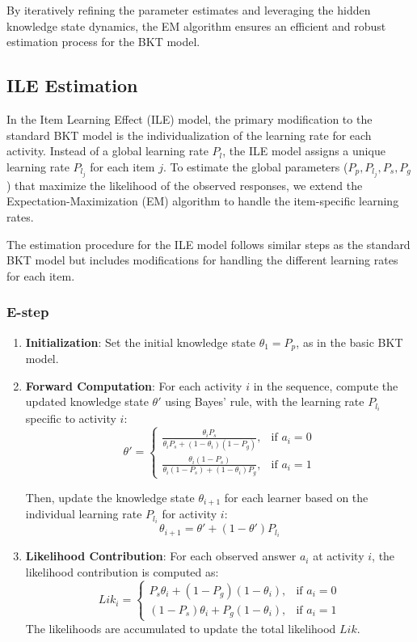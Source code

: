 \documentclass{article}
\begin{document}
By iteratively refining the parameter estimates and leveraging the hidden knowledge state dynamics, the EM algorithm ensures an efficient and robust estimation process for the BKT model.   


\subsection{ILE Estimation}

In the Item Learning Effect (ILE) model, the primary modification to the standard BKT model is the individualization of the learning rate for each activity. Instead of a global learning rate \( P_l \), the ILE model assigns a unique learning rate \( P_{l_j} \) for each item \( j \). To estimate the global parameters (\( P_p, P_{l_j}, P_s, P_g \)) that maximize the likelihood of the observed responses, we extend the Expectation-Maximization (EM) algorithm to handle the item-specific learning rates.



The estimation procedure for the ILE model follows similar steps as the standard BKT model but includes modifications for handling the different learning rates for each item.

\subsubsection{E-step}

\begin{enumerate}
    \item \textbf{Initialization}:
    Set the initial knowledge state \(\theta_1 = P_p\), as in the basic BKT model.
    
    \item \textbf{Forward Computation}:
    For each activity \(i\) in the sequence, compute the updated knowledge state \(\theta'\) using Bayes' rule, with the learning rate \(P_{l_i}\) specific to activity \(i\):
    \[
    \theta' = 
    \begin{cases} 
        \frac{\theta_i P_s}{\theta_i P_s + (1 - \theta_i)(1 - P_g)}, & \text{if } a_i = 0 \\
        \frac{\theta_i (1 - P_s)}{\theta_i (1 - P_s) + (1 - \theta_i)P_g}, & \text{if } a_i = 1
    \end{cases}
    \]
    
    Then, update the knowledge state \(\theta_{i+1}\) for each learner based on the individual learning rate \(P_{l_i}\) for activity \(i\):
    \[
    \theta_{i+1} = \theta' + (1 - \theta') P_{l_i}
    \]
    
    \item \textbf{Likelihood Contribution}:
    For each observed answer \(a_i\) at activity \(i\), the likelihood contribution is computed as:
    \[
    Lik_i = 
    \begin{cases} 
        P_s \theta_i + (1 - P_g)(1 - \theta_i), & \text{if } a_i = 0 \\
        (1 - P_s)\theta_i + P_g(1 - \theta_i), & \text{if } a_i = 1
    \end{cases}
    \]
    The likelihoods are accumulated to update the total likelihood \(Lik\).
\end{enumerate}
\end{document}
